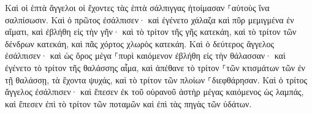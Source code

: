 \documentclass{openreader}
\begin{document}
Καὶ οἱ ἑπτὰ ἄγγελοι οἱ ἔχοντες τὰς ἑπτὰ σάλπιγγας ἡτοίμασαν ⸀αὑτοὺς ἵνα σαλπίσωσιν. 
Καὶ ὁ πρῶτος ἐσάλπισεν· καὶ ἐγένετο χάλαζα καὶ πῦρ μεμιγμένα ἐν αἵματι, καὶ ἐβλήθη εἰς τὴν γῆν· καὶ τὸ τρίτον τῆς γῆς κατεκάη, καὶ τὸ τρίτον τῶν δένδρων κατεκάη, καὶ πᾶς χόρτος χλωρὸς κατεκάη. 
Καὶ ὁ δεύτερος ἄγγελος ἐσάλπισεν· καὶ ὡς ὄρος μέγα ⸀πυρὶ καιόμενον ἐβλήθη εἰς τὴν θάλασσαν· καὶ ἐγένετο τὸ τρίτον τῆς θαλάσσης αἷμα, 
καὶ ἀπέθανε τὸ τρίτον ⸀τῶν κτισμάτων τῶν ἐν τῇ θαλάσσῃ, τὰ ἔχοντα ψυχάς, καὶ τὸ τρίτον τῶν πλοίων ⸀διεφθάρησαν. 
Καὶ ὁ τρίτος ἄγγελος ἐσάλπισεν· καὶ ἔπεσεν ἐκ τοῦ οὐρανοῦ ἀστὴρ μέγας καιόμενος ὡς λαμπάς, καὶ ἔπεσεν ἐπὶ τὸ τρίτον τῶν ποταμῶν καὶ ἐπὶ τὰς πηγὰς τῶν ὑδάτων. 
\end{document}
